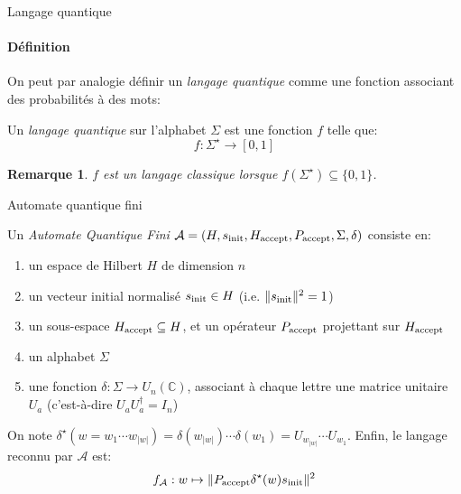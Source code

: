 \documentclass[aspectratio=169]{beamer}
\theoremstyle{plain}
\newtheorem*{remark}{Remarque}
\theoremstyle{definition}
\begin{document}
\begin{frame}{Langage quantique}
    \framesubtitle{Définition}
    On peut par analogie définir un \emph{langage quantique} comme une fonction associant des probabilités à des mots:
    \begin{definition}
        Un \emph{langage quantique} sur l'alphabet $\Sigma$ est une fonction $f$ telle que:
        \begin{equation*}
            f : \Sigma^\star \to [0, 1]
        \end{equation*}
        
    \end{definition}

    \begin{remark}
        $f$ est un langage classique lorsque $f(\Sigma^\star) \subseteq \{0, 1\}$.
    \end{remark}
\end{frame}

\begin{frame}{Automate quantique fini}
    \begin{definition}[AQF]
        Un \emph{Automate Quantique Fini} $\mathcal{A}=(H, s_{\textnormal{init}}, H_{\textnormal{accept}}, P_{\textnormal{accept}}, \Sigma, \delta)$ consiste en:
        \begin{enumerate}[label=--, noitemsep]
            \item un espace de Hilbert $H$ de dimension $n$
            \item un vecteur initial normalisé $s_{\textnormal{init}}\in H$ (i.e. $\|s_{\textnormal{init}}\|^2=1$)
            \item un sous-espace $H_{\textnormal{accept}} \subseteq H$, et un opérateur $P_{\textnormal{accept}}$ projettant sur $H_{\textnormal{accept}}$
            \item un alphabet $\Sigma$
            \item une fonction $\delta : \Sigma \to U_n(\mathbb{C})$, associant à chaque lettre une matrice unitaire $U_a$ (c'est-à-dire $U_aU_a^\dagger = I_n$)
        \end{enumerate}
        
        On note $\delta^\star(w=w_1\cdots w_{|w|}) = \delta(w_{|w|})\cdots \delta(w_1) = U_{w_{|w|}}\cdots U_{w_1}$. Enfin, le langage reconnu par $\mathcal{A}$ est:
        \begin{equation*}
            f_{\mathcal{A}} : w \mapsto \|P_{\textnormal{accept}}\delta^\star(w)s_{\textnormal{init}}\|^2
        \end{equation*}
    \end{definition}
\end{frame}
\end{document}
